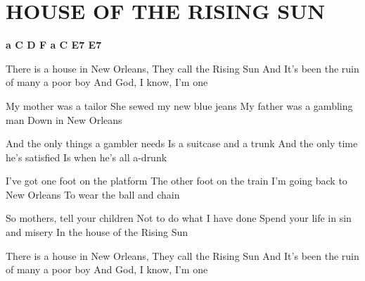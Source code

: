 \documentclass[../../../songbook.tex]{subfiles}
\begin{document}
\TabPositions{8cm} %
\section*{HOUSE OF THE RISING SUN}
{}
\vspace{0.5cm}
{\color{red}\textbf{a C D F a C E7 E7} } \newline

There is a house in New Orleans,  \newline
They call the Rising Sun  \newline
And It's been the ruin of many a poor boy  \newline
And God, I know, I'm one  \newline

My mother was a tailor			\newline
She sewed my new blue jeans			\newline
My father was a gambling man			\newline
Down in New Orleans			\newline

And the only things a gambler needs			\newline
Is a suitcase and a trunk			\newline
And the only time he's satisfied			\newline
Is when he's all a-drunk			\newline

I've got one foot on the platform			\newline
The other foot on the train			\newline
I'm going back to New Orleans			\newline
To wear the ball and chain			\newline

So mothers, tell your children			\newline
Not to do what I have done			\newline
Spend your life in sin and misery			\newline
In the house of the Rising Sun			\newline

There is a house in New Orleans,			\newline
They call the Rising Sun			\newline
And It's been the ruin of many a poor boy			\newline
And God, I know, I'm one			\newline
\end{document}
